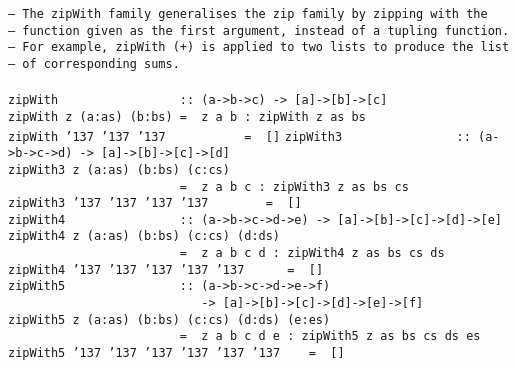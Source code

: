 %
\eprogB\noindent\bprogB
\mbox{\tt --\ The\ zipWith\ family\ generalises\ the\ zip\ family\ by\ zipping\ with\ the}\\
\mbox{\tt --\ function\ given\ as\ the\ first\ argument,\ instead\ of\ a\ tupling\ function.}\\
\mbox{\tt --\ For\ example,\ zipWith\ (+)\ is\ applied\ to\ two\ lists\ to\ produce\ the\ list}\\
\mbox{\tt --\ of\ corresponding\ sums.}\\
\mbox{\tt }\\[-8pt]
\mbox{\tt zipWith\ \ \ \ \ \ \ \ \ \ \ \ \ \ \ \ \ ::\ (a->b->c)\ ->\ [a]->[b]->[c]}\\
\mbox{\tt zipWith\ z\ (a:as)\ (b:bs)\ =\ \ z\ a\ b\ :\ zipWith\ z\ as\ bs}\\
\mbox{\tt zipWith\ {\char'137}\ {\char'137}\ {\char'137}\ \ \ \ \ \ \ \ \ \ \ =\ \ []}
%
\eprogB\noindent\bprogB
\mbox{\tt zipWith3\ \ \ \ \ \ \ \ \ \ \ \ \ \ \ \ ::\ (a->b->c->d)\ ->\ [a]->[b]->[c]->[d]}\\
\mbox{\tt zipWith3\ z\ (a:as)\ (b:bs)\ (c:cs)}\\
\mbox{\tt \ \ \ \ \ \ \ \ \ \ \ \ \ \ \ \ \ \ \ \ \ \ \ \ =\ \ z\ a\ b\ c\ :\ zipWith3\ z\ as\ bs\ cs}\\
\mbox{\tt zipWith3\ {\char'137}\ {\char'137}\ {\char'137}\ {\char'137}\ \ \ \ \ \ \ \ =\ \ []}
%
\eprogB\noindent\bprogB
\mbox{\tt zipWith4\ \ \ \ \ \ \ \ \ \ \ \ \ \ \ \ ::\ (a->b->c->d->e)\ ->\ [a]->[b]->[c]->[d]->[e]}\\
\mbox{\tt zipWith4\ z\ (a:as)\ (b:bs)\ (c:cs)\ (d:ds)}\\
\mbox{\tt \ \ \ \ \ \ \ \ \ \ \ \ \ \ \ \ \ \ \ \ \ \ \ \ =\ \ z\ a\ b\ c\ d\ :\ zipWith4\ z\ as\ bs\ cs\ ds}\\
\mbox{\tt zipWith4\ {\char'137}\ {\char'137}\ {\char'137}\ {\char'137}\ {\char'137}\ \ \ \ \ \ =\ \ []}
%
\eprogB\noindent\bprogB
\mbox{\tt zipWith5\ \ \ \ \ \ \ \ \ \ \ \ \ \ \ \ ::\ (a->b->c->d->e->f)}\\
\mbox{\tt \ \ \ \ \ \ \ \ \ \ \ \ \ \ \ \ \ \ \ \ \ \ \ \ \ \ \ ->\ [a]->[b]->[c]->[d]->[e]->[f]}\\
\mbox{\tt zipWith5\ z\ (a:as)\ (b:bs)\ (c:cs)\ (d:ds)\ (e:es)}\\
\mbox{\tt \ \ \ \ \ \ \ \ \ \ \ \ \ \ \ \ \ \ \ \ \ \ \ \ =\ \ z\ a\ b\ c\ d\ e\ :\ zipWith5\ z\ as\ bs\ cs\ ds\ es}\\
\mbox{\tt zipWith5\ {\char'137}\ {\char'137}\ {\char'137}\ {\char'137}\ {\char'137}\ {\char'137}\ \ \ \ =\ \ []}
